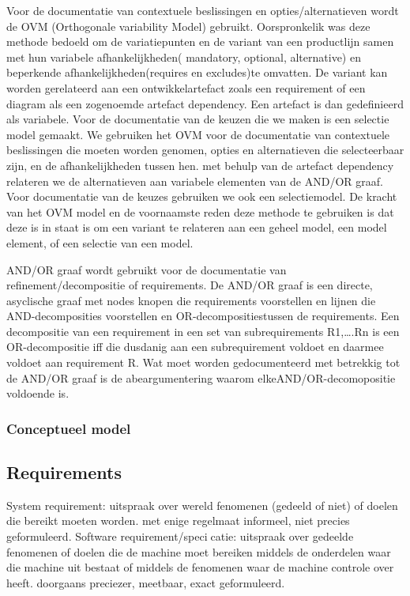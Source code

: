 \documentclass{article}
\begin{document}
Voor de documentatie van contextuele beslissingen en opties/alternatieven wordt de OVM (Orthogonale variability Model) gebruikt. Oorspronkelik was deze methode bedoeld om de variatiepunten en de variant van een productlijn samen met hun variabele afhankelijkheden( mandatory, optional, alternative)  en beperkende afhankelijkheden(requires en excludes)te omvatten. De variant kan worden gerelateerd aan een ontwikkelartefact zoals een requirement of een diagram als een zogenoemde artefact dependency. Een artefact is dan gedefinieerd als variabele. Voor de documentatie van de keuzen die we maken is een selectie model gemaakt. We gebruiken het OVM voor de documentatie van contextuele beslissingen die moeten worden genomen, opties en alternatieven die selecteerbaar zijn, en de afhankelijkheden tussen hen. met behulp van de artefact dependency relateren we de alternatieven aan variabele elementen van de AND/OR graaf. Voor documentatie van de keuzes gebruiken we ook een selectiemodel. De kracht van het OVM model en de voornaamste reden deze methode te gebruiken is dat deze is in staat is om een variant te relateren aan een geheel model, een model element, of een selectie van een model. 

AND/OR graaf wordt gebruikt voor de documentatie van refinement/decompositie of requirements. De AND/OR graaf is een directe, asyclische graaf met nodes knopen die requirements voorstellen en lijnen die AND-decomposities voorstellen en OR-decompositiestussen de requirements. Een decompositie van een requirement in een set van subrequirements R1,….Rn is een OR-decompositie iff die dusdanig aan een subrequirement voldoet en daarmee voldoet aan requirement R. Wat moet worden gedocumenteerd met betrekkig tot de AND/OR graaf is de abeargumentering waarom elkeAND/OR-decomopositie  voldoende is. 
\subsubsection{Conceptueel model}



\subsection{Requirements}


System requirement:
uitspraak over wereld fenomenen (gedeeld of niet) of doelen
die bereikt moeten worden.
met enige regelmaat informeel, niet precies geformuleerd.
Software requirement/specicatie:
uitspraak over gedeelde fenomenen of doelen die de machine
moet bereiken middels de onderdelen waar die machine uit
bestaat of middels de fenomenen waar de machine controle
over heeft.
doorgaans preciezer, meetbaar, exact geformuleerd.
\end{document}
